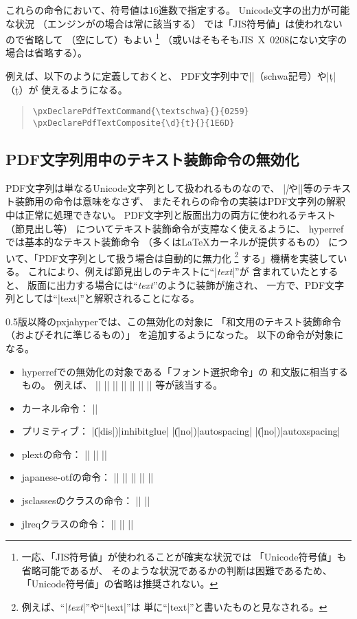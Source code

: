 \documentclass[uplatex,dvipdfmx,a4paper]{jsarticle}
\newcommand{\Pkg}[1]{\textsf{#1}}
\newcommand{\Means}{：\quad}
\begin{document}
これらの命令において、符号値は16進数で指定する。
Unicode文字の出力が可能な状況
（エンジンが{\upLaTeX}の場合は常に該当する）
では「JIS符号値」は使われないので省略して
（空にして）もよい
\footnote{一応、「JIS符号値」が使われることが確実な状況では
「Unicode符号値」も省略可能であるが、
そのような状況であるかの判断は困難であるため、
「Unicode符号値」の省略は推奨されない。}%
（或いはそもそもJIS~X~0208にない文字の場合は省略する）。

例えば、以下のように定義しておくと、
PDF文字列中で|\textschwa|（schwa記号）や|\d{t}|（\d{t}）が
使えるようになる。
\begin{quote}\small\begin{verbatim}
\pxDeclarePdfTextCommand{\textschwa}{}{0259}
\pxDeclarePdfTextComposite{\d}{t}{}{1E6D}
\end{verbatim}\end{quote}

\subsection{PDF文字列用中のテキスト装飾命令の無効化}
\label{ssec:disablecmds}

PDF文字列は単なるUnicode文字列として扱われるものなので、
|\textit|や|\large|等のテキスト装飾用の命令は意味をなさず、
またそれらの命令の実装はPDF文字列の解釈中は正常に処理できない。
PDF文字列と版面出力の両方に使われるテキスト（節見出し等）
についてテキスト装飾命令が支障なく使えるように、
\Pkg{hyperref}では基本的なテキスト装飾命令
（多くは{\LaTeX}カーネルが提供するもの）
について、「PDF文字列として扱う場合は自動的に無力化
\footnote{例えば、“|\textit{text}|”や“|{\large text}|”は
  単に“|text|”と書いたものと見なされる。}
する」機構を実装している。
これにより、例えば節見出しのテキストに“|\textit{text}|”が
含まれていたとすると、
版面に出力する場合には“\textit{text}”のように装飾が施され、
一方で、PDF文字列としては“|text|”と解釈されることになる。

0.5版以降の\Pkg{pxjahyper}では、この無効化の対象に
「和文用のテキスト装飾命令（およびそれに準じるもの）」
を追加するようになった。
以下の命令が対象になる。

\begin{itemize}
\item \Pkg{hyperref}での無効化の対象である「フォント選択命令」の
  和文版に相当するもの。
  例えば、
  |\textmc| |\gtfamily| |\kanjifamily| |\romanshape|
  |\usekanji| |\useroman| |\userelfont|
  等が該当する。
\item {\pLaTeX}カーネル命令\Means
  |\<|
\item {\pTeX}プリミティブ\Means
  |\|(|dis|)|inhibitglue| |\|(|no|)|autospacing| |\|(|no|)|autoxspacing|
\item \Pkg{plext}の命令\Means
  |\bou| |\kasen| |\rensuji|
\item \Pkg{japanese-otf}の命令\Means
  |\textmg| |\mgfamily| |\ltseries| |\ebseries| |\propshape|
\item \Pkg{jsclasses}のクラスの命令\Means
  |\maybeblue| |\HUGE|
\item \Pkg{jlreq}クラスの命令\Means
  |\jafontsize| |\tatechuyoko| |\jidori| %
\end{itemize}
\end{document}
